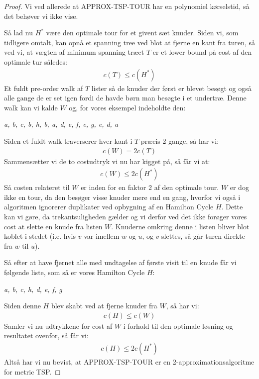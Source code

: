 \begin{proof}
 Vi ved allerede at APPROX-TSP-TOUR har en polynomiel kørselstid, så det behøver vi ikke vise. 

Så lad nu $H^*$ være den optimale tour for et givent sæt knuder. Siden vi, som tidligere omtalt, kan opnå et spanning tree ved blot at fjerne en kant fra turen, så ved vi, at vægten af minimum spanning træet $T$ er et lower bound på cost af den optimale tur således:
\begin{align*}
 c(T) \leq c(H^*)
\end{align*}
Et fuldt pre-order walk af $T$ lister så de knuder der først er blevet besøgt og også alle gange de er set igen fordi de havde børn man besøgte i et undertræ. Denne walk kan vi kalde $W$ og, for vores eksempel indeholdte den:
\begin{center}
 \textit{a, b, c, b, h, b, a, d, e, f, e, g, e, d, a}
\end{center}
Siden et fuldt walk traverserer hver kant i $T$ præcis 2 gange, så har vi:
\begin{align*}
 c(W) = 2c(T)
\end{align*}
Sammensætter vi de to costudtryk vi nu har kigget på, så får vi at:
\begin{align*}
 c(W) \leq 2c(H^*)
\end{align*}
Så costen relateret til $W$ er inden for en faktor 2 af den optimale tour. $W$ er dog ikke en tour, da den besøger visse knuder mere end en gang, hvorfor vi også i algoritmen ignorerer duplikater ved opbygning af en Hamilton Cycle $H$. Dette kan vi gøre, da trekantsuligheden gælder og vi derfor ved det ikke forøger vores cost at slette en knude fra listen $W$. Knuderne omkring denne i listen bliver blot koblet i stedet (i.e. hvis $v$ var imellem $w$ og $u$, og $v$ slettes, så går turen direkte fra $w$ til $u$). 

Så efter at have fjernet alle med undtagelse af første visit til en knude får vi følgende liste, som så er vores Hamilton Cycle $H$:
\begin{center}
 \textit{a, b, c, h, d, e, f, g}
\end{center}
Siden denne $H$ blev skabt ved at fjerne knuder fra $W$, så har vi:
\begin{align*}
 c(H) \leq c(W)
\end{align*}
Samler vi nu udtrykkene for cost af $W$ i forhold til den optimale løsning og resultatet ovenfor, så får vi:
\begin{align*}
 c(H) \leq 2c(H^*)
\end{align*}
Altså har vi nu bevist, at APPROX-TSP-TOUR er en 2-approximationsalgoritme for metric TSP.
\end{proof}

